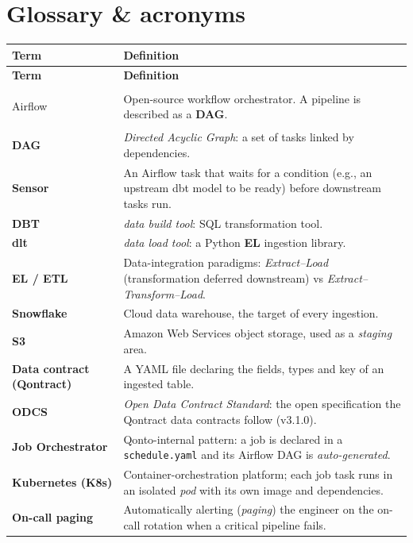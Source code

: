 \chapter*{Glossary \& acronyms}

\renewcommand{\arraystretch}{1.25}
\begin{longtable}{@{}>{\bfseries}p{3.2cm} p{\dimexpr\textwidth-3.2cm-2\tabcolsep\relax}@{}}
\toprule
\textbf{Term} & \textbf{Definition} \\
\midrule
\endfirsthead
\toprule
\textbf{Term} & \textbf{Definition} \\
\midrule
\endhead
\bottomrule
\endfoot

Airflow & Open-source workflow orchestrator. A pipeline is described as a \textbf{DAG}. \\
DAG & \emph{Directed Acyclic Graph}: a set of tasks linked by dependencies. \\
Sensor & An Airflow task that waits for a condition (e.g., an upstream dbt model to be ready) before downstream tasks run. \\
DBT & \emph{data build tool}: SQL transformation tool. \\
dlt & \emph{data load tool}: a Python \textbf{EL} ingestion library. \\
EL / ETL & Data-integration paradigms: \emph{Extract–Load} (transformation deferred downstream) vs \emph{Extract–Transform–Load}. \\
Snowflake & Cloud data warehouse, the target of every ingestion. \\
S3 & Amazon Web Services object storage, used as a \emph{staging} area. \\
Data contract (Qontract) & A YAML file declaring the fields, types and key of an ingested table. \\
ODCS & \emph{Open Data Contract Standard}: the open specification the Qontract data contracts follow (v3.1.0). \\
Job Orchestrator & Qonto-internal pattern: a job is declared in a \texttt{schedule.yaml} and its Airflow DAG is \emph{auto-generated}. \\
Kubernetes (K8s) & Container-orchestration platform; each job task runs in an isolated \emph{pod} with its own image and dependencies. \\
On-call paging & Automatically alerting (\emph{paging}) the engineer on the on-call rotation when a critical pipeline fails. \\

\end{longtable}
